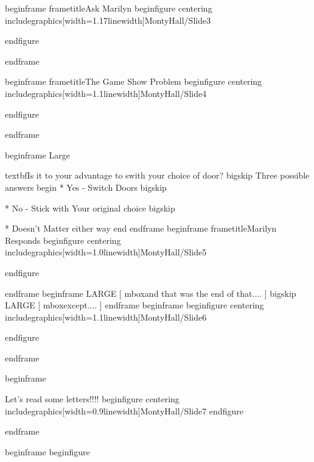 begin{frame}
	frametitle{Ask Marilyn}
	begin{figure}
		centering
		includegraphics[width=1.17linewidth]{MontyHall/Slide3}

	end{figure}
	
end{frame}

	
	begin{frame}
		frametitle{The Game Show Problem}
		begin{figure}
			centering
			includegraphics[width=1.1linewidth]{MontyHall/Slide4}
	
		end{figure}
		
	end{frame}

begin{frame}
Large

textbf{Is it to your advantage to swith your choice of door?} bigskip
Three possible answers 
begin{ }
         * Yes - Switch Doors bigskip

         * No - Stick with Your original choice bigskip

         * Doesn't Matter either way
end{ }
end{frame}
begin{frame}
frametitle{Marilyn Responds}
		begin{figure}
		centering
		includegraphics[width=1.0linewidth]{MontyHall/Slide5}
		
	end{figure}
		
end{frame}
begin{frame}
	LARGE
	[ mbox{and that was the end of that....} ]
	bigskip
		LARGE
		[ mbox{except....} ]
end{frame}
begin{frame}
	begin{figure}
		centering
		includegraphics[width=1.1linewidth]{MontyHall/Slide6}
		
	end{figure}
	
end{frame}

begin{frame}
	
	Let's read some letters!!!!
	begin{figure}
		centering
		includegraphics[width=0.9linewidth]{MontyHall/Slide7}
		end{figure}
	
end{frame}

begin{frame}
	begin{figure}

